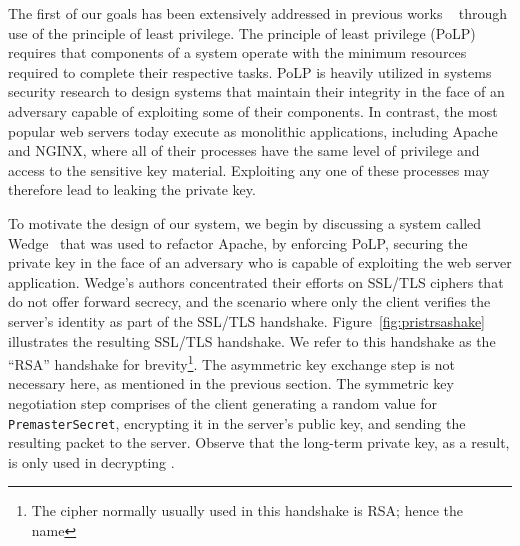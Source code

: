 \documentclass[../main.tex]{subfiles}
\begin{document}
The first of our goals has been extensively addressed in previous
works ~\cite{Bittau08, Krohn2004} through use of the principle of
least privilege. The principle of least privilege (PoLP) requires that
components of a system operate with the minimum resources required to
complete their respective tasks. PoLP is heavily utilized in systems
security research to design systems that maintain their integrity in
the face of an adversary capable of exploiting some of their
components. In contrast, the most popular web servers today execute as
monolithic applications, including Apache and NGINX, where all of
their processes have the same level of privilege and access to the
sensitive key material. Exploiting any one of these processes may
therefore lead to leaking the private key.

To motivate the design of our system, we begin by discussing a system
called Wedge~\cite{Bittau08} that was used to refactor Apache, by
enforcing PoLP, securing the private key in the face of an adversary
who is capable of exploiting the web server application. Wedge's
authors concentrated their efforts on SSL/TLS ciphers that do not
offer forward secrecy, and the scenario where only the client verifies
the server's identity as part of the SSL/TLS handshake.
Figure~\ref{fig:pristrsashake} illustrates the resulting SSL/TLS
handshake. We refer to this handshake as the ``RSA'' handshake for
brevity\footnote{The cipher normally usually used in this handshake is
  RSA; hence the name}. The asymmetric key exchange step is not
necessary here, as mentioned in the previous section. The symmetric
key negotiation step comprises of the client generating a random value
for \texttt{PremasterSecret}, encrypting it in the server's public
key, and sending the resulting packet to the server. Observe that the
long-term private key, as a result, is only used in decrypting
\premaster.
\end{document}
